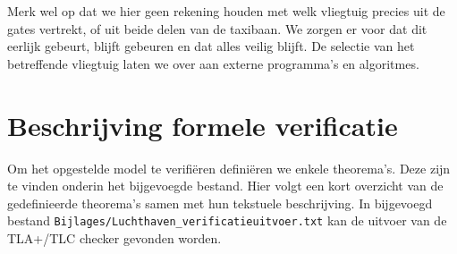 Merk wel op dat we hier geen rekening houden met welk vliegtuig precies uit de gates vertrekt, of uit beide delen van de taxibaan. We zorgen er voor dat dit eerlijk gebeurt, blijft gebeuren en dat alles veilig blijft. De selectie van het betreffende vliegtuig laten we over aan externe programma's en algoritmes.

\section{Beschrijving formele verificatie}
Om het opgestelde model te verifiëren definiëren we enkele theorema's. Deze zijn te vinden onderin het bijgevoegde bestand. Hier volgt een kort overzicht van de gedefinieerde theorema's samen met hun tekstuele beschrijving. In bijgevoegd bestand \texttt{Bijlages/Luchthaven\_verificatieuitvoer.txt} kan de uitvoer van de TLA+/TLC checker gevonden worden.

